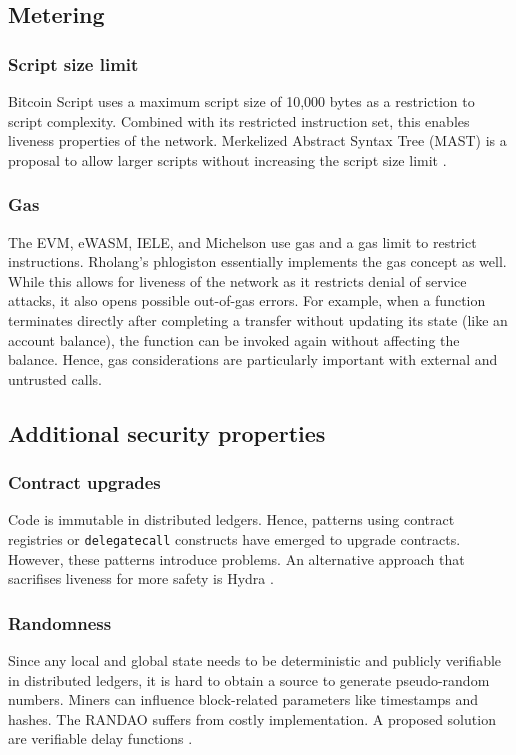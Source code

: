 \subsection{Metering}

\subsubsection{Script size limit}
Bitcoin Script uses a maximum script size of 10,000 bytes as a restriction to script complexity. Combined with its restricted instruction set, this enables liveness properties of the network. Merkelized Abstract Syntax Tree (MAST) is a proposal to allow larger scripts without increasing the script size limit \cite{Harding2017}.

\subsubsection{Gas}
The EVM, eWASM, IELE, and Michelson use gas and a gas limit to restrict instructions. Rholang's phlogiston essentially implements the gas concept as well. While this allows for liveness of the network as it restricts denial of service attacks, it also opens possible out-of-gas errors. For example, when a function terminates directly after completing a transfer without updating its state (like an account balance), the function can be invoked again without affecting the balance.
Hence, gas considerations are particularly important with external and untrusted calls.


\subsection{Additional security properties} 
\subsubsection{Contract upgrades}
Code is immutable in distributed ledgers. Hence, patterns using contract registries or \texttt{delegatecall} constructs have emerged to upgrade contracts. However, these patterns introduce problems. An alternative approach that sacrifises liveness for more safety is Hydra \cite{Breidenbach2018}.

\subsubsection{Randomness}
Since any local and global state needs to be deterministic and publicly verifiable in distributed ledgers, it is hard to obtain a source to generate pseudo-random numbers.
Miners can influence block-related parameters like timestamps and hashes. The RANDAO suffers from costly implementation. A proposed solution are verifiable delay functions \cite{Boneh2018}.

